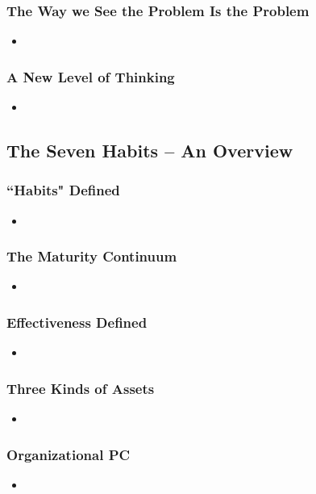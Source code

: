 \documentclass[11pt]{article}
\begin{document}
\subsubsection{The Way we See the Problem Is the Problem}
\begin{itemize}
\item 
\end{itemize}
\subsubsection{A New Level of Thinking}
\begin{itemize}
\item 
\end{itemize}
\subsection{The Seven Habits -- An Overview}
\subsubsection{``Habits" Defined}
\begin{itemize}
\item 
\end{itemize}
\subsubsection{The Maturity Continuum}
\begin{itemize}
\item 
\end{itemize}
\subsubsection{Effectiveness Defined}
\begin{itemize}
\item 
\end{itemize}
\subsubsection{Three Kinds of Assets}
\begin{itemize}
\item 
\end{itemize}
\subsubsection{Organizational PC}
\begin{itemize}
\item 
\end{itemize}
\end{document}
